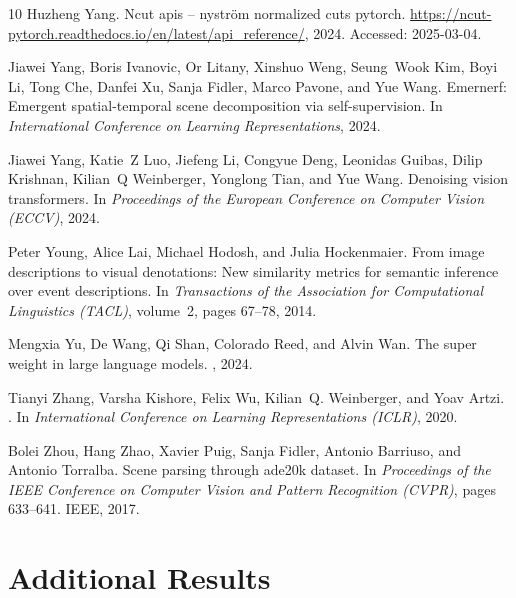 \documentclass[10pt,twocolumn,letterpaper]{article}
\begin{document}
{\begin{thebibliography}{10}
Huzheng Yang.
\newblock Ncut apis -- nyström normalized cuts pytorch.
\newblock \url{https://ncut-pytorch.readthedocs.io/en/latest/api_reference/}, 2024.
\newblock Accessed: 2025-03-04.

Jiawei Yang, Boris Ivanovic, Or Litany, Xinshuo Weng, Seung~Wook Kim, Boyi Li, Tong Che, Danfei Xu, Sanja Fidler, Marco Pavone, and Yue Wang.
\newblock Emernerf: Emergent spatial-temporal scene decomposition via self-supervision.
\newblock In {\em International Conference on Learning Representations}, 2024.

Jiawei Yang, Katie~Z Luo, Jiefeng Li, Congyue Deng, Leonidas Guibas, Dilip Krishnan, Kilian~Q Weinberger, Yonglong Tian, and Yue Wang.
\newblock Denoising vision transformers.
\newblock In {\em Proceedings of the European Conference on Computer Vision (ECCV)}, 2024.

Peter Young, Alice Lai, Michael Hodosh, and Julia Hockenmaier.
\newblock From image descriptions to visual denotations: New similarity metrics for semantic inference over event descriptions.
\newblock In {\em Transactions of the Association for Computational Linguistics (TACL)}, volume~2, pages 67--78, 2014.

Mengxia Yu, De Wang, Qi Shan, Colorado Reed, and Alvin Wan.
\newblock The super weight in large language models.
, 2024.

Tianyi Zhang, Varsha Kishore, Felix Wu, Kilian~Q. Weinberger, and Yoav Artzi.
.
\newblock In {\em International Conference on Learning Representations (ICLR)}, 2020.

Bolei Zhou, Hang Zhao, Xavier Puig, Sanja Fidler, Antonio Barriuso, and Antonio Torralba.
\newblock Scene parsing through ade20k dataset.
\newblock In {\em Proceedings of the IEEE Conference on Computer Vision and Pattern Recognition (CVPR)}, pages 633--641. IEEE, 2017.

\end{thebibliography}
 
}


\clearpage
\appendix
\section{Additional Results}
\label{sec:appendix_results}
\end{document}
